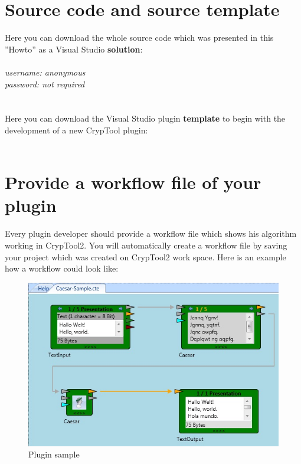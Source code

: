 \section{Source code and source template}\label{sec:SourceCodeAndSourceTemplate}
Here you can download the whole source code which was presented in this ''Howto'' as a Visual Studio \textbf{solution}:\\\\
\textit{username: anonymous\\
password: not required\\}
\\\\
Here you can download the Visual Studio plugin \textbf{template} to begin with the development of a new CrypTool plugin:\\\\
\clearpage
\section{Provide a workflow file of your plugin}\label{ProvideAWorkflowFileOfYourPlugin}
Every plugin developer should provide a workflow file which shows his algorithm working in CrypTool2. You will automatically create a workflow file by saving your project which was created on CrypTool2 work space. Here is an example how a workflow could look like:
\begin{figure}[h]
	\centering
		\includegraphics{figures/sample.jpg}
	\caption{Plugin sample}
	\label{fig:sample}
\end{figure} 